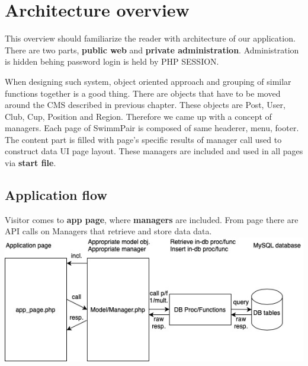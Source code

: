 \chapter{Architecture overview}
This overview should familiarize the reader with architecture of our application. There are two parts, \textbf{public web} and \textbf{private administration}. Administration is hidden behing password login is held by PHP SESSION. 
\par
When designing such system, object oriented approach and grouping of similar functions together is a good thing. There are objects that have to be moved around the CMS described in previous chapter. These objects are Post, User, Club, Cup, Position and Region. Therefore we came up with a concept of managers. Each page of SwimmPair is composed of same headerer, menu, footer. The content part is filled with page's specific results of manager call used to construct data UI page layout. These managers are included and used in all pages via \textbf{start file}.
\section{Application flow}
Visitor comes to \textbf{app page}, where \textbf{managers} are included. From page there are API calls on Managers that retrieve and store data data.
\newline
\includegraphics[scale=0.707]{img/app-schema.jpg}
